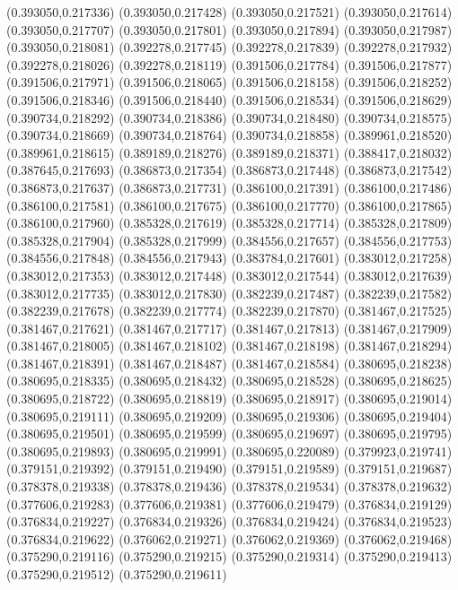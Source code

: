 (0.393050,0.217336)
(0.393050,0.217428)
(0.393050,0.217521)
(0.393050,0.217614)
(0.393050,0.217707)
(0.393050,0.217801)
(0.393050,0.217894)
(0.393050,0.217987)
(0.393050,0.218081)
(0.392278,0.217745)
(0.392278,0.217839)
(0.392278,0.217932)
(0.392278,0.218026)
(0.392278,0.218119)
(0.391506,0.217784)
(0.391506,0.217877)
(0.391506,0.217971)
(0.391506,0.218065)
(0.391506,0.218158)
(0.391506,0.218252)
(0.391506,0.218346)
(0.391506,0.218440)
(0.391506,0.218534)
(0.391506,0.218629)
(0.390734,0.218292)
(0.390734,0.218386)
(0.390734,0.218480)
(0.390734,0.218575)
(0.390734,0.218669)
(0.390734,0.218764)
(0.390734,0.218858)
(0.389961,0.218520)
(0.389961,0.218615)
(0.389189,0.218276)
(0.389189,0.218371)
(0.388417,0.218032)
(0.387645,0.217693)
(0.386873,0.217354)
(0.386873,0.217448)
(0.386873,0.217542)
(0.386873,0.217637)
(0.386873,0.217731)
(0.386100,0.217391)
(0.386100,0.217486)
(0.386100,0.217581)
(0.386100,0.217675)
(0.386100,0.217770)
(0.386100,0.217865)
(0.386100,0.217960)
(0.385328,0.217619)
(0.385328,0.217714)
(0.385328,0.217809)
(0.385328,0.217904)
(0.385328,0.217999)
(0.384556,0.217657)
(0.384556,0.217753)
(0.384556,0.217848)
(0.384556,0.217943)
(0.383784,0.217601)
(0.383012,0.217258)
(0.383012,0.217353)
(0.383012,0.217448)
(0.383012,0.217544)
(0.383012,0.217639)
(0.383012,0.217735)
(0.383012,0.217830)
(0.382239,0.217487)
(0.382239,0.217582)
(0.382239,0.217678)
(0.382239,0.217774)
(0.382239,0.217870)
(0.381467,0.217525)
(0.381467,0.217621)
(0.381467,0.217717)
(0.381467,0.217813)
(0.381467,0.217909)
(0.381467,0.218005)
(0.381467,0.218102)
(0.381467,0.218198)
(0.381467,0.218294)
(0.381467,0.218391)
(0.381467,0.218487)
(0.381467,0.218584)
(0.380695,0.218238)
(0.380695,0.218335)
(0.380695,0.218432)
(0.380695,0.218528)
(0.380695,0.218625)
(0.380695,0.218722)
(0.380695,0.218819)
(0.380695,0.218917)
(0.380695,0.219014)
(0.380695,0.219111)
(0.380695,0.219209)
(0.380695,0.219306)
(0.380695,0.219404)
(0.380695,0.219501)
(0.380695,0.219599)
(0.380695,0.219697)
(0.380695,0.219795)
(0.380695,0.219893)
(0.380695,0.219991)
(0.380695,0.220089)
(0.379923,0.219741)
(0.379151,0.219392)
(0.379151,0.219490)
(0.379151,0.219589)
(0.379151,0.219687)
(0.378378,0.219338)
(0.378378,0.219436)
(0.378378,0.219534)
(0.378378,0.219632)
(0.377606,0.219283)
(0.377606,0.219381)
(0.377606,0.219479)
(0.376834,0.219129)
(0.376834,0.219227)
(0.376834,0.219326)
(0.376834,0.219424)
(0.376834,0.219523)
(0.376834,0.219622)
(0.376062,0.219271)
(0.376062,0.219369)
(0.376062,0.219468)
(0.375290,0.219116)
(0.375290,0.219215)
(0.375290,0.219314)
(0.375290,0.219413)
(0.375290,0.219512)
(0.375290,0.219611)
